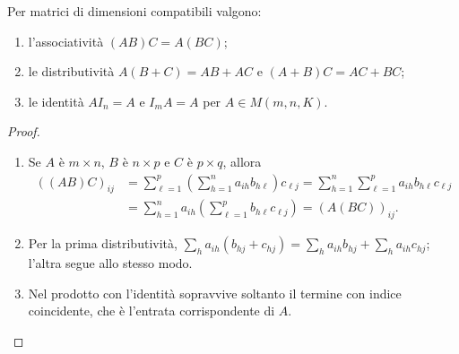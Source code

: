 \begin{proposizione}
Per matrici di dimensioni compatibili valgono:
\begin{enumerate}[label=\arabic*.]
\item l'associatività $(AB)C=A(BC)$;
\item le distributività $A(B+C)=AB+AC$ e $(A+B)C=AC+BC$;
\item le identità $AI_n=A$ e $I_mA=A$ per $A\in M(m,n,K)$.
\end{enumerate}
\end{proposizione}
\begin{proof}
\begin{enumerate}[label=\arabic*.]
\item Se $A$ è $m\times n$, $B$ è $n\times p$ e $C$ è $p\times q$, allora
\begin{align*}
 ((AB)C)_{ij}
 &=\sum_{\ell=1}^p\left(\sum_{h=1}^n a_{ih}b_{h\ell}\right)c_{\ell j}
 =\sum_{h=1}^n\sum_{\ell=1}^p a_{ih}b_{h\ell}c_{\ell j}\\
 &=\sum_{h=1}^n a_{ih}\left(\sum_{\ell=1}^p b_{h\ell}c_{\ell j}\right)
 =(A(BC))_{ij}.
\end{align*}
\item Per la prima distributività, $\sum_h a_{ih}(b_{hj}+c_{hj})=\sum_h a_{ih}b_{hj}+\sum_h a_{ih}c_{hj}$; l'altra segue allo stesso modo.
\item Nel prodotto con l'identità sopravvive soltanto il termine con indice coincidente, che è l'entrata corrispondente di $A$.
\end{enumerate}
\end{proof}

